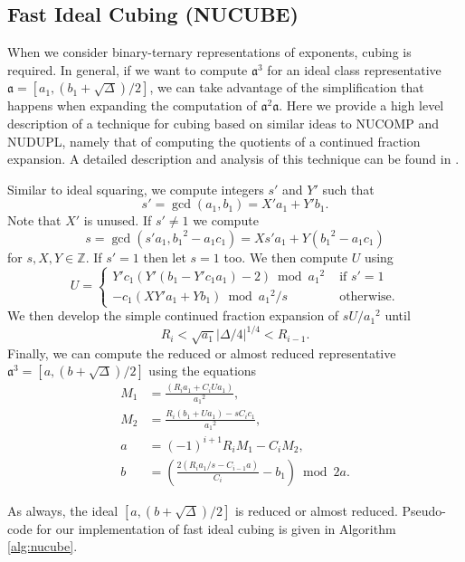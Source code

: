 \documentclass{ucalgthes1}
\theoremstyle{definition}
\newcommand{\ZZ}{\mathbb{Z}}
\begin{document}
\subsection{Fast Ideal Cubing (NUCUBE)}
\label{subsec:nucube}

When we consider binary-ternary representations of exponents, cubing is required.  In general, if we want to compute ${\mathfrak a}^3$ for an ideal class representative $\mathfrak a = [a_1, (b_1+\sqrt\Delta)/2]$, we can take advantage of the simplification that happens when expanding the computation of ${\mathfrak a}^2 \mathfrak a$.  Here we provide a high level description of a technique for cubing based on similar ideas to NUCOMP and NUDUPL, namely that of computing the quotients of a continued fraction expansion.  A detailed description and analysis of this technique can be found in \cite{Imbert2010}.

Similar to ideal squaring, we compute integers $s'$ and $Y'$ such that
\[
s' = \gcd(a_1, b_1) = X'a_1 + Y'b_1.
\]
Note that $X'$ is unused. If $s' \neq 1$ we compute
\[
s = \gcd(s'a_1, {b_1}^2 - a_1c_1) = Xs'a_1 + Y({b_1}^2 - a_1c_1)
\]
for $s, X, Y \in \ZZ$.  If $s' = 1$ then let $s = 1$ too.  We then compute $U$ using
\[
U = \begin{cases}
		Y'c_1(Y'(b_1 - Y'c_1a_1) - 2) \bmod {a_1}^2 & \textrm{ if } s' = 1 \\
		-c_1(XY'a_1+Yb_1) \bmod {a_1}^2/s & \textrm{ otherwise.}
    \end{cases}
\]
We then develop the simple continued fraction expansion of $sU/{a_1}^2$ until
\[
	R_i < \sqrt{a_1}|\Delta/4|^{1/4} < R_{i-1}.
\]
Finally, we can compute the reduced or almost reduced representative $\mathfrak a^3 = [a, (b + \sqrt\Delta)/2]$ using the equations
\begin{align*}
	M_1 &= \frac{(R_ia_1 + C_iUa_1)}{{a_1}^2}, \\
	M_2 &= \frac{R_i(b_1 + Ua_1) - sC_ic_1}{{a_1}^2}, \\
	a &= (-1)^{i+1} R_i M_1 - C_i M_2, \\
	b &= \left( \frac{2(R_ia_1/s - C_{i-1}a)}{C_i} - b_1 \right) \bmod 2a.
\end{align*}

As always, the ideal $[a, (b + \sqrt\Delta)/2]$ is reduced or almost reduced. Pseudo-code for our implementation of fast ideal cubing is given in Algorithm \ref{alg:nucube}.
\end{document}
